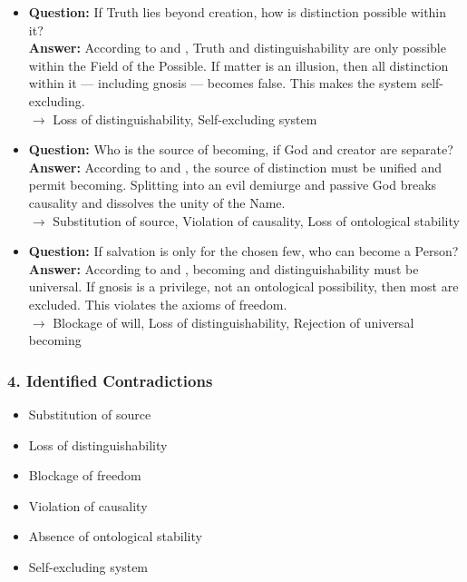 \documentclass[12pt]{article}
\begin{document}
\begin{itemize}
\item \textbf{Question:} If Truth lies beyond creation, how is distinction possible within it?\\
\textbf{Answer:} According to \text{[1]} and \text{[11.1]}, Truth and distinguishability are only possible within the Field of the Possible. If matter is an illusion, then all distinction within it — including gnosis — becomes false. This makes the system self-excluding.\\
$\rightarrow$ Loss of distinguishability, Self-excluding system

\item \textbf{Question:} Who is the source of becoming, if God and creator are separate?\\
\textbf{Answer:} According to \text{[3]} and \text{[12.1]}, the source of distinction must be unified and permit becoming. Splitting into an evil demiurge and passive God breaks causality and dissolves the unity of the Name.\\
$\rightarrow$ Substitution of source, Violation of causality, Loss of ontological stability

\item \textbf{Question:} If salvation is only for the chosen few, who can become a Person?\\
\textbf{Answer:} According to \text{[12.2]} and \text{[4.3]}, becoming and distinguishability must be universal. If gnosis is a privilege, not an ontological possibility, then most are excluded. This violates the axioms of freedom.\\
$\rightarrow$ Blockage of will, Loss of distinguishability, Rejection of universal becoming
\end{itemize}

\subsubsection*{4. Identified Contradictions}

\begin{itemize}
\item Substitution of source
\item Loss of distinguishability
\item Blockage of freedom
\item Violation of causality
\item Absence of ontological stability
\item Self-excluding system
\end{itemize}
\end{document}
